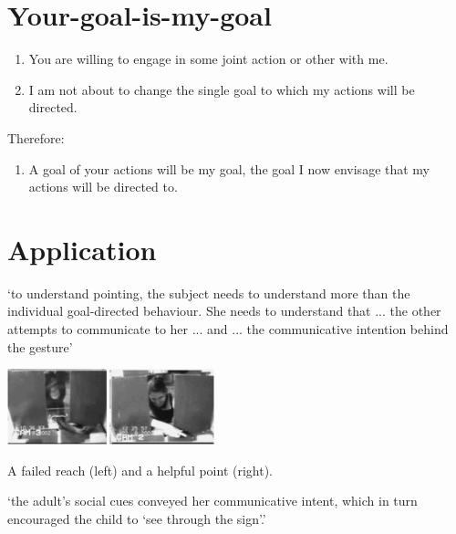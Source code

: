 \documentclass[11pt]{extarticle}
\begin{document}
\begin{multicols}{3}
\section{Your-goal-is-my-goal}
\begin{enumerate}
\item You are willing to engage in some joint action or other with me.

\item I am not about to change the single goal to which my actions will be directed.

\end{enumerate}
%
Therefore:
%
\begin{enumerate}[resume]
%
\item A goal of your actions will be my goal, the goal I now envisage that my actions will be directed to.
\end{enumerate}
%

\section{Application}

`to understand pointing, the subject needs to understand more than the individual goal-directed behaviour. She needs to understand that ... the other attempts to communicate to her ...  and ... the communicative intention behind the gesture'\citep{Moll:2007gu}


\begin{center}
\includegraphics[width=6cm]{figure_hare_toma_2004_e3.png}
\label{fig:reach_point}

A failed reach (left) and a helpful point (right).\citep%
	{hare_chimpanzees_2004}
\end{center}



`the adult’s social cues conveyed her communicative intent, which in turn encouraged the child to `see through the sign'.'
\citep%
{leekam_adults_2010}




\footnotesize 


\end{multicols}
\end{document}
